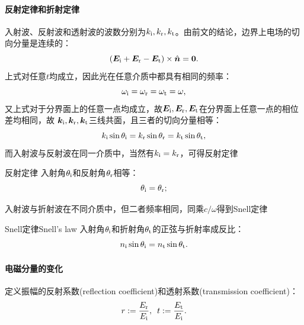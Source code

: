 \paragraph{反射定律和折射定律}
入射波、反射波和透射波的波数分别为$k_{\mathrm{i}},k_\text r,k_\text t$。由前文的结论，边界上电场的切向分量是连续的：
\[
    (\bm E_{\mathrm{i}}+\bm E_\text r-\bm E_\text t)\times\mathop{}\!\hat{\bm{n}}=\bm 0.
\]
上式对任意$t$均成立，因此光在任意介质中都具有相同的频率：
\begin{equation}
    \label{eqn:omegai=omegar=omegat}
    \omega_{\mathrm{i}}=\omega_\text r=\omega_\text t=\omega,
\end{equation}
又上式对于分界面上的任意一点均成立，故$\bm E_{\mathrm{i}},\bm E_\text r,\bm E_\text t$在分界面上任意一点的相位差均相同，故
$\bm k_{\mathrm{i}},\bm k_\text r,\bm k_\text t$三线共面，且三者的切向分量相等：
\begin{equation}
    k_{\mathrm{i}}\sin\theta_{\mathrm{i}}=k_\text r\sin\theta_\text r=k_\text t\sin\theta_\text t,
\end{equation}
而入射波与反射波在同一介质中，当然有$k_{\mathrm{i}}=k_\text r$，可得反射定律
\begin{theorem}{反射定律}{}
    入射角$\theta_{\mathrm{i}}$和反射角$\theta_\text r$相等：
    \begin{equation}
        \theta_{\mathrm{i}}=\theta_\text r;
    \end{equation}
\end{theorem}
入射波与折射波在不同介质中，但二者频率相同，同乘$c/\omega$得到Snell定律
\begin{theorem}{Snell定律}{Snell's law}
    入射角$\theta_{\mathrm{i}}$和折射角$\theta_\text t$的正弦与折射率成反比：
    \begin{equation}
        \label{eqn:Snell}
        n_{\mathrm{i}}\sin\theta_{\mathrm{i}}=n_\text t\sin\theta_\text t.
    \end{equation}
\end{theorem}

\paragraph{电磁分量的变化}

定义振幅的反射系数(reflection coefficient)和透射系数(transmission coefficient)：
\[
    r:=\frac{E_\text r}{E_{\mathrm{i}}},\enspace t:=\frac{E_\text t}{E_{\mathrm{i}}}.
\]

